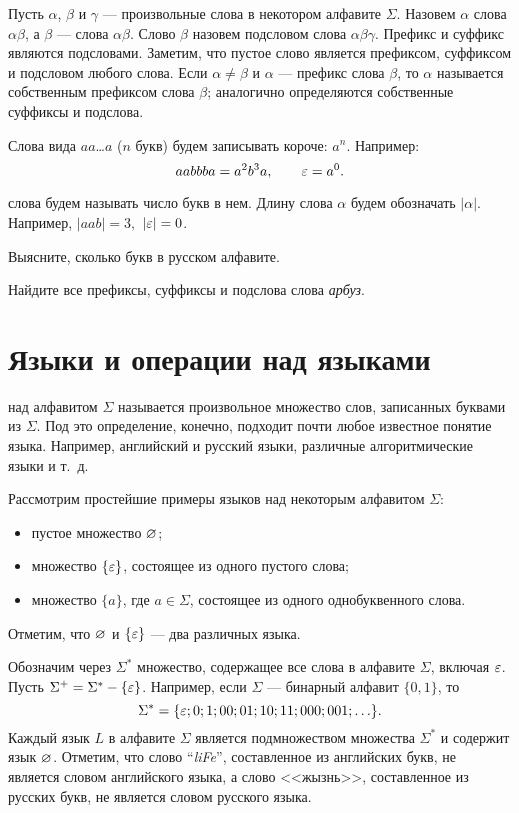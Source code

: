 Пусть $\alpha$, $\beta$ и $\gamma$ --- произвольные слова в некотором алфавите $\Sigma$. Назовем $\alpha$  слова $\alpha\beta$, а $\beta$ ---  слова $\alpha\beta$. Слово $\beta$ назовем подсловом слова $\alpha\beta\gamma$. Префикс и суффикс являются подсловами. Заметим, что пустое слово является префиксом, суффиксом и подсловом любого слова. Если $\alpha\neq\beta$ и $\alpha$ --- префикс слова $\beta$, то $\alpha$ называется собственным префиксом слова $\beta$; аналогично определяются собственные суффиксы и подслова.

Слова вида $aa$\ldots$a$ ($n$ букв) будем записывать короче: $a^n$.
Например:
\[aabbba=a^2b^3a, \qquad \varepsilon=a^0.\]

 слова будем называть число букв в нем. Длину слова $\alpha$ будем обозначать $|\alpha|$. Например, $|aab|=3,$ $|\varepsilon|=0$.

\begin{myproblem}
Выясните, сколько букв в русском алфавите.
\end{myproblem}

\begin{myproblem}
Найдите все префиксы, суффиксы и подслова слова \emph{арбуз}.
\end{myproblem}

\section{Языки и операции над языками}
\label{Chapter1LangsOps}

 над алфавитом $\Sigma$ называется произвольное множество слов, записанных буквами из $\Sigma$. Под это определение, конечно, подходит почти любое известное понятие языка. Например, английский и русский языки, различные алгоритмические языки и т.~д.

Рассмотрим простейшие примеры языков над некоторым алфавитом $\Sigma$:
\begin{itemize}
    \item пустое множество $\varnothing$;
    \item множество $\{\varepsilon\}$, состоящее из одного пустого слова;
    \item множество $\{a\}$, где $a\in\Sigma$, состоящее из одного однобуквенного слова.
\end{itemize}
Отметим, что $\varnothing$ и $\{\varepsilon\}$ --- два различных языка.

Обозначим через $\Sigma^*$ множество, содержащее все слова в алфавите $\Sigma$, включая $\varepsilon$. Пусть $\Sigma^+=\Sigma^* - \{\varepsilon\}$. Например, если $\Sigma$ --- бинарный алфавит $\{0,1\}$, то
\[
    \Sigma^* = \{ \varepsilon; 0; 1; 00; 01; 10; 11; 000; 001; \ldots \}.
\]
Каждый язык $L$ в алфавите $\Sigma$ является подмножеством множества $\Sigma^*$ и содержит язык $\varnothing$. Отметим, что слово
``\emph{liFe}'', составленное из английских букв, не является словом английского языка, а слово <<жызнь>>, составленное из русских букв, не является словом русского языка.

